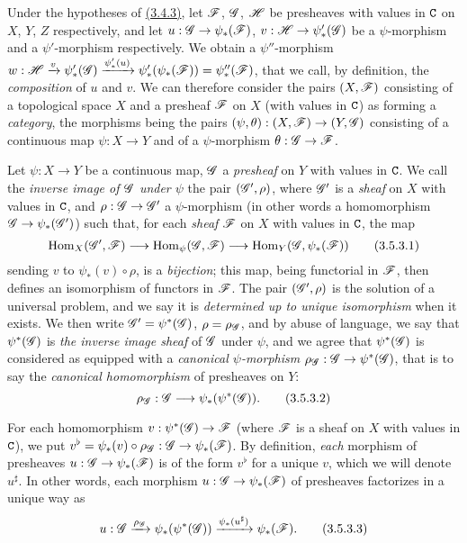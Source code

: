 \begin{env}[3.5.2]
\label{0.3.5.2}
Under the hypotheses of \hyperref[0.3.4.3]{(3.4.3)}, let $\mathscr{F}$, $\mathscr{G}$, $\mathscr{H}$ be
presheaves with values in $\mathtt{C}$ on $X$, $Y$, $Z$ respectively, and let
$u:\mathscr{G}\to\psi_*(\mathscr{F})$, $v:\mathscr{H}\to\psi_*'(\mathscr{G})$ be a $\psi$-morphism
and a $\psi'$-morphism respectively. We obtain a $\psi''$-morphism
$w:\mathscr{H}\xrightarrow{v}\psi_*'(\mathscr{G})\xrightarrow{\psi_*'(u)}
  \psi_*'(\psi_*(\mathscr{F}))=\psi_*''(\mathscr{F})$, that we call, by definition, the
{\em composition} of $u$ and $v$. We can therefore consider the pairs
$(X,\mathscr{F})$ consisting of a topological space $X$ and a presheaf $\mathscr{F}$ on
$X$ (with values in $\mathtt{C}$) as forming a {\em category}, the morphisms being the
pairs $(\psi,\theta):(X,\mathscr{F})\to(Y,\mathscr{G})$ consisting of a continuous map
$\psi:X\to Y$ and of a $\psi$-morphism $\theta:\mathscr{G}\to\mathscr{F}$.
\end{env}

\begin{env}[3.5.3]
\label{0.3.5.3}
Let $\psi:X\to Y$ be a continuous map, $\mathscr{G}$ a {\em presheaf} on $Y$ with
values in $\mathtt{C}$. We call the {\em inverse image of $\mathscr{G}$ under $\psi$} the
pair $(\mathscr{G}',\rho)$, where $\mathscr{G}'$ is a {\em sheaf} on $X$ with values in
$\mathtt{C}$, and $\rho:\mathscr{G}\to\mathscr{G}'$ a $\psi$-morphism (in other words a
homomorphism $\mathscr{G}\to\psi_*(\mathscr{G}')$) such that, for each {\em sheaf}
$\mathscr{F}$ on $X$ with values in $\mathtt{C}$, the map
\[
  {\mathop{\mathrm{Hom}}\nolimits}_X(\mathscr{G}',\mathscr{F})\longrightarrow{\mathop{\mathrm{Hom}}\nolimits}_\psi(\mathscr{G},\mathscr{F})
  \longrightarrow{\mathop{\mathrm{Hom}}\nolimits}_Y(\mathscr{G},\psi_*(\mathscr{F}))
  \tag{3.5.3.1}
\]
sending $v$ to $\psi_*(v)\circ\rho$, is a {\em bijection}; this map, being
functorial in $\mathscr{F}$, then defines an isomorphism of functors in $\mathscr{F}$. The
pair $(\mathscr{G}',\rho)$ is the solution of a universal problem, and we say it is
{\em determined up to unique isomorphism} when it exists. We then write
$\mathscr{G}'=\psi^*(\mathscr{G})$, $\rho=\rho_\mathscr{G}$, and by abuse of language, we say
that $\psi^*(\mathscr{G})$ is {\em the inverse image sheaf} of $\mathscr{G}$ under
$\psi$, and we agree that $\psi^*(\mathscr{G})$ is considered as equipped with a
{\em canonical $\psi$-morphism $\rho_\mathscr{G}:\mathscr{G}\to\psi^*(\mathscr{G})$}, that is
to say the {\em canonical homomorphism} of presheaves on $Y$:
\[
  \rho_\mathscr{G}:\mathscr{G}\longrightarrow\psi_*(\psi^*(\mathscr{G})).
  \tag{3.5.3.2}
\]

For each homomorphism $v:\psi^*(\mathscr{G})\to\mathscr{F}$ (where $\mathscr{F}$ is a sheaf on
$X$ with values in $\mathtt{C}$), we put
$v^\flat=\psi_*(v)\circ\rho_\mathscr{G}:\mathscr{G}\to\psi_*(\mathscr{F})$. By definition,
{\em each} morphism of presheaves $u:\mathscr{G}\to\psi_*(\mathscr{F})$ is of the form
$v^\flat$ for a unique $v$, which we will denote $u^\sharp$. In other words,
each morphism $u:\mathscr{G}\to\psi_*(\mathscr{F})$ of presheaves factorizes in a unique
way as
\[
  u:\mathscr{G}\xrightarrow{\rho_\mathscr{G}}\psi_*(\psi^*(\mathscr{G}))
  \xrightarrow{\psi_*(u^\sharp)}\psi_*(\mathscr{F}).
  \tag{3.5.3.3}
\]
\end{env}

